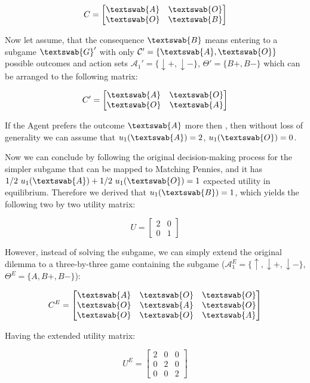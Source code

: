 \documentclass{article}
\begin{document}
\[
C=
\begin{bmatrix}
\textswab{A} & \textswab{O} \\
\textswab{O} & \textswab{B}
\end{bmatrix}
\]

Now let assume, that the consequence $\textswab{B}$ means entering to a subgame $\textswab{G}'$ with only $\mathcal{C}'=\{\textswab{A},\textswab{O}\}$ possible outcomes and action sets $\mathcal{A}_1'=\{\downarrow+,\downarrow-\}$, $\Theta'=\{B+,B-\}$ which can be arranged to the following matrix:

\[
C'=
\begin{bmatrix}
\textswab{A} & \textswab{O} \\
\textswab{O} & \textswab{A}
\end{bmatrix}
\]

If the Agent prefers the outcome $\textswab{A}$ more then , then without loss of generality we can assume that $u_1(\textswab{A})=2$, $u_1(\textswab{O})=0$.

Now we can conclude by following the original decision-making process for the simpler subgame that can be mapped to Matching Pennies, and it has $1/2 \ u_1(\textswab{A}) + 1/2 \ u_1(\textswab{O}) = 1$ expected utility in equilibrium. Therefore we derived that $u_1(\textswab{B}) = 1$, which yields the following two by two utility matrix:

\[
U=
\begin{bmatrix}
2 & 0 \\
0 & 1
\end{bmatrix}
\]

However, instead of solving the subgame, we can simply extend the original dilemma to a three-by-three game containing the subgame ($\mathcal{A}^E_1=\{\uparrow,\downarrow+,\downarrow-\}$, $\Theta^E=\{A,B+,B-\}$):

\[
C^E=
\begin{bmatrix}
\textswab{A} & \textswab{O} & \textswab{O} \\
\textswab{O} & \textswab{A} & \textswab{O} \\
\textswab{O} & \textswab{O} & \textswab{A}
\end{bmatrix}
\]

Having the extended utility matrix:

\[
U^E=
\begin{bmatrix}
2 & 0 & 0 \\
0 & 2 & 0 \\
0 & 0 & 2 
\end{bmatrix}
\]
\end{document}
